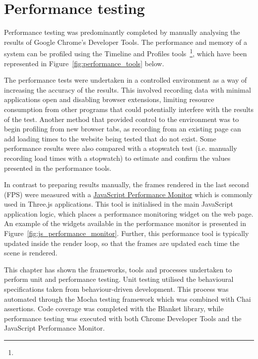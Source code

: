 \section{Performance testing} {
\label{sec:performance_testing}

	Performance testing was predominantly completed by manually analysing the results of Google Chrome's Developer Tools. The performance and memory of a system can be profiled using the Timeline and Profiles tools~\footnote{}, which have been represented in Figure~\ref{fig:performance_tools} below.

	

	The performance tests were undertaken in a controlled environment as a way of increasing the accuracy of the results. This involved recording data with minimal applications open and disabling browser extensions, limiting resource consumption from other programs that could potentially interfere with the results of the test. Another method that provided control to the environment was to begin profiling from new browser tabs, as recording from an existing page can add loading times to the website being tested that do not exist. Some performance results were also compared with a stopwatch test (i.e. manually recording load times with a stopwatch) to estimate and confirm the values presented in the performance tools.

	In contrast to preparing results manually, the frames rendered in the last second (FPS) were measured with a \href{https://github.com/mrdoob/stats.js/}{JavaScript Performance Monitor} which is commonly used in Three.js applications. This tool is initialised in the main JavaScript application logic, which places a performance monitoring widget on the web page. An example of the widgets available in the performance monitor is presented in Figure~\ref{fig:js_performance_monitor}. Further, this performance tool is typically updated inside the render loop, so that the frames are updated each time the scene is rendered.

	

}

This chapter has shown the frameworks, tools and processes undertaken to perform unit and performance testing. Unit testing utilised the behavioural specifications taken from behaviour-driven development. This process was automated through the Mocha testing framework which was combined with Chai assertions. Code coverage was completed with the Blanket library, while performance testing was executed with both Chrome Developer Tools and the JavaScript Performance Monitor. 
